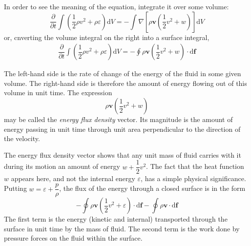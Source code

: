 \documentclass[conference]{IEEEtran}
\theoremstyle{definition}
\theoremstyle{remark}
\begin{document}
    In order to see the meaning of the equation, integrate it over some volume:
    \begin{equation*}
        \dfrac{\partial}{\partial t} \int \left( \dfrac12 \rho v^2 + \rho \varepsilon \right) \mathrm{d} V = -\int \nabla \left[ \rho \mathbf{v} \left(\dfrac12 v^2 + w\right) \right] \mathrm{d} V
    \end{equation*}
    or, cnverting the volume integral on the right into a surface integral,
    \begin{align}
        \dfrac{\partial}{\partial t} \int \left( \dfrac12 \rho v^2 + \rho \varepsilon \right) \mathrm{d} V = -\oint \rho \mathbf{v} \left( \dfrac12 v^2 + w \right) \cdot \mathrm{d} \mathbf{f}
    \end{align}
    
    The left-hand side is the rate of change of the energy of the fluid in some given volume. The right-hand side is therefore the amount of energy flowing out of this volume in unit time. The expression
    \begin{equation}
        \rho \mathbf{v} \left( \dfrac12 v^2 + w \right)
    \end{equation}
    may be called the \emph{energy flux density} vector. Its magnitude is the amount of energy passing in unit time through unit area perpendicular to the direction of the velocity.

    The energy flux density vector shows that any unit mass of fluid carries with it during its motion an amount of energy $w + \dfrac12 v^2$. The fact that the heat function $w$ appears here, and not the internal energy $\varepsilon$, has a simple physical significance. Putting $w = \varepsilon + \dfrac{p}\rho$, the flux of the energy through a closed surface is in the form
    \[
        -\oint \rho \mathbf{v} \left( \dfrac12 v^2 + \varepsilon \right) \cdot \mathrm{d} \mathbf{f} - \oint \rho \mathbf{v} \cdot \mathrm{d} \mathbf{f}
    \]
    The first term is the energy (kinetic and internal) transported through the surface in unit time by the mass of fluid. The second term is the work done by pressure forces on the fluid within the surface.
\end{document}
